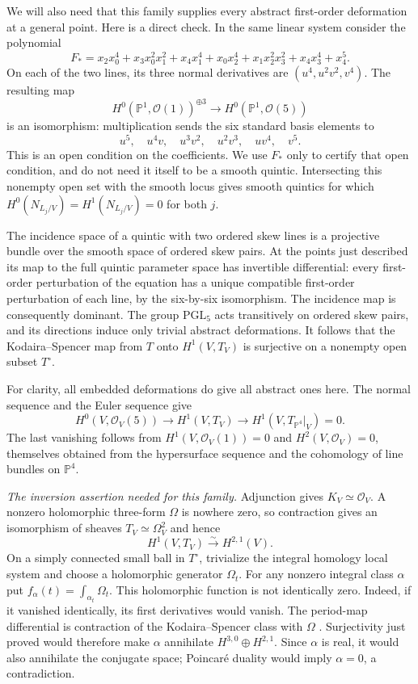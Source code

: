 We will also need that this family supplies every abstract first-order
deformation at a general point. Here is a direct check. In the same
linear system consider the polynomial
\[
 F_* =x_2x_0^4+x_3x_0^2x_1^2+x_4x_1^4
       +x_0x_2^4+x_1x_2^2x_3^2+x_4x_3^4+x_4^5.
\]
On each of the two lines, its three normal derivatives are
$(u^4,u^2v^2,v^4)$. The resulting map
\[
 H^0(\mathbb P^1,\mathcal O(1))^{\oplus3}
       \longrightarrow H^0(\mathbb P^1,\mathcal O(5))
\]
is an isomorphism: multiplication sends the six standard basis elements
to
\[
 u^5,\quad u^4v,\quad u^3v^2,\quad u^2v^3,\quad uv^4,\quad v^5.
\]
This is an open condition on
the coefficients. We use $F_*$ only to certify that open condition,
and do not need it itself to be a smooth quintic. Intersecting this
nonempty open set with the smooth locus gives smooth quintics for which
$H^0(N_{L_j/V})=H^1(N_{L_j/V})=0$ for both $j$.

The incidence space of a quintic with two ordered skew lines is a
projective bundle over the smooth space of ordered skew pairs. At the
points just described its map to the full quintic parameter space has
invertible differential: every first-order perturbation of the equation
has a unique compatible first-order perturbation of each line, by the
six-by-six isomorphism. The incidence map is consequently dominant.
The group $\mathrm{PGL}_5$ acts transitively on ordered skew pairs,
and its directions induce only trivial abstract deformations. It follows
that the Kodaira--Spencer map from $T$ onto $H^1(V,T_V)$ is surjective
on a nonempty open subset $T^\circ$.

For clarity, all embedded deformations do give all abstract ones here.
The normal sequence and the Euler sequence give
\[
 H^0(V,\mathcal O_V(5))\longrightarrow H^1(V,T_V)\longrightarrow
 H^1(V,T_{\mathbb P^4}|_V)=0.
\]
The last vanishing follows from $H^1(V,\mathcal O_V(1))=0$ and
$H^2(V,\mathcal O_V)=0$, themselves obtained from the hypersurface
sequence and the cohomology of line bundles on $\mathbb P^4$.

\emph{The inversion assertion needed for this family.}
Adjunction gives $K_V\simeq\mathcal O_V$. A nonzero holomorphic
three-form $\Omega$ is nowhere zero, so contraction gives an isomorphism
of sheaves $T_V\simeq\Omega_V^2$ and hence
\[
 H^1(V,T_V)\xrightarrow{\sim}H^{2,1}(V).
\]
On a simply connected small ball in $T^\circ$, trivialize the integral
homology local system and choose a holomorphic generator $\Omega_t$.
For any nonzero integral class $\alpha$ put
$f_\alpha(t)=\int_{\alpha_t}\Omega_t$. This holomorphic function is
not identically zero. Indeed, if it vanished identically, its first
derivatives would vanish. The period-map differential is contraction
of the Kodaira--Spencer class with $\Omega$
\citep[Theorem (1.27), p.~816]{cyGriffiths1968}. Surjectivity just proved
would therefore make $\alpha$ annihilate $H^{3,0}\oplus H^{2,1}$.
Since $\alpha$ is real, it would also annihilate the conjugate space;
Poincar\'e duality would imply $\alpha=0$, a contradiction.

